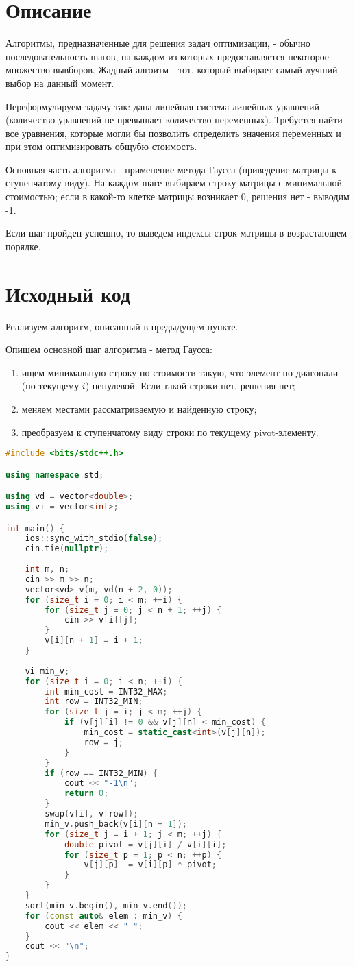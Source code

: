 \section{Описание}
Алгоритмы, предназначенные для решения задач оптимизации, - обычно последовательность шагов, на каждом из которых предоставляется некоторое множество вывборов. Жадный алгоитм - тот, который выбирает самый лучший выбор на данный момент.

Переформулируем задачу так: дана линейная система линейных уравнений (количество уравнений не превышает количество переменных). Требуется найти все уравнения, которые могли бы позволить определить значения переменных и при этом оптимизировать общубю стоимость.

Основная часть алгоритма - применение метода Гаусса (приведение матрицы к ступенчатому виду). На каждом шаге выбираем строку матрицы с минимальной стоимостью; если в какой-то клетке матрицы возникает 0, решения нет - выводим -1.

Если шаг пройден успешно, то выведем индексы строк матрицы в возрастающем порядке.
\pagebreak

\section{Исходный код}
Реализуем алгоритм, описанный в предыдущем пункте.

Опишем основной шаг алгоритма - метод Гаусса:
\begin{enumerate}
	\item ищем минимальную строку по стоимости такую, что элемент по диагонали (по текущему $i$) ненулевой. Если такой строки нет, решения нет;
	\item меняем местами рассматриваемую и найденную строку;
	\item преобразуем к ступенчатому виду строки по текущему pivot-элементу.
\end{enumerate}

\begin{lstlisting}[language=C++]
#include <bits/stdc++.h>

using namespace std;

using vd = vector<double>;
using vi = vector<int>;

int main() {
	ios::sync_with_stdio(false);
	cin.tie(nullptr);
	
	int m, n;
	cin >> m >> n;
	vector<vd> v(m, vd(n + 2, 0));
	for (size_t i = 0; i < m; ++i) {
		for (size_t j = 0; j < n + 1; ++j) {
			cin >> v[i][j];
		}
		v[i][n + 1] = i + 1;
	}
	
	vi min_v;
	for (size_t i = 0; i < n; ++i) {
		int min_cost = INT32_MAX;
		int row = INT32_MIN;
		for (size_t j = i; j < m; ++j) {
			if (v[j][i] != 0 && v[j][n] < min_cost) {
				min_cost = static_cast<int>(v[j][n]);
				row = j;
			}
		}
		if (row == INT32_MIN) { 
			cout << "-1\n"; 
			return 0; 
		}
		swap(v[i], v[row]);
		min_v.push_back(v[i][n + 1]);
		for (size_t j = i + 1; j < m; ++j) {
			double pivot = v[j][i] / v[i][i];
			for (size_t p = 1; p < n; ++p) {
				v[j][p] -= v[i][p] * pivot;
			}
		}
	}
	sort(min_v.begin(), min_v.end());
	for (const auto& elem : min_v) {
		cout << elem << " ";
	}
	cout << "\n";
}	
\end{lstlisting}


